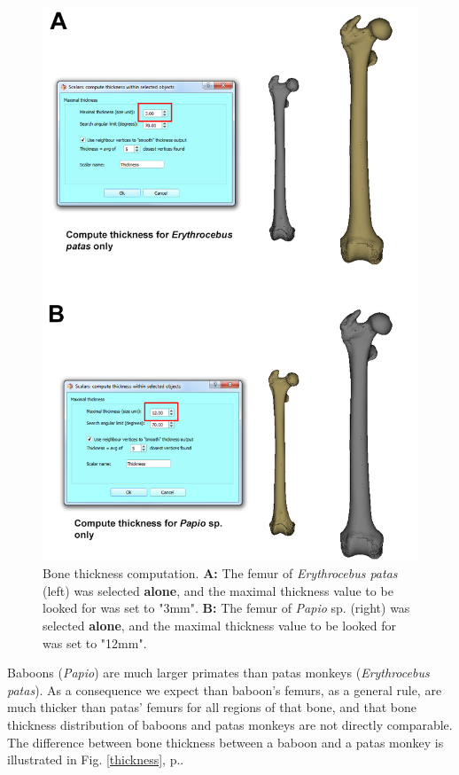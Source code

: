 \documentclass[12pt, a4paper]{book}
\begin{document}
\begin{figure}
  \centering
  \includegraphics[scale=0.45]{Compute_thickness.png}
\caption{Bone thickness computation. \textbf{A:} The femur of \textit{Erythrocebus patas} (left) was selected \textbf{alone}, and the maximal thickness value to be looked for was set to "3mm". \textbf{B:} The femur of \textit{Papio} sp. (right) was selected \textbf{alone}, and the maximal thickness value to be looked for was set to "12mm".}	
\label{compute_thickness}
 \end{figure}

Baboons (\textit{Papio}) are much larger primates than patas monkeys (\textit{Erythrocebus patas}). As a consequence we expect than baboon's femurs, as a general rule, are much thicker than patas' femurs for all regions of that bone, and that bone thickness distribution of baboons and patas monkeys are not directly comparable. The difference between bone thickness between a baboon and a patas monkey is illustrated in Fig. \ref{thickness}, p.\pageref{thickness}. 
\end{document}
